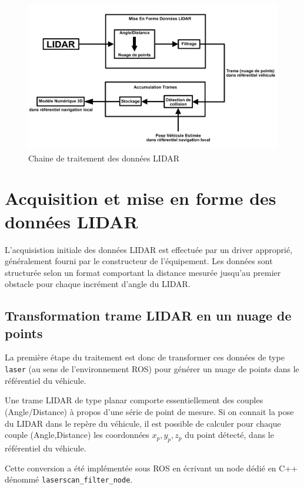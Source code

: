 \documentclass[12pt,a4paper]{report}
\begin{document}
\begin{figure}[h!]
	\centering
	\includegraphics[width=1\linewidth]{img/architraitlidar}
	\caption[architraitlidat]{Chaine de traitement des données LIDAR}
	\label{fig:architraitlidar}
\end{figure}

	\section{Acquisition et mise en forme des données LIDAR}
	L'acquisistion initiale des données LIDAR est effectuée par un driver approprié, généralement fourni par le constructeur de l'équipement. Les données sont structurée selon un format comportant la distance mesurée jusqu'au premier obstacle pour chaque incrément d'angle du LIDAR.

	
		\subsection{Transformation trame LIDAR en un nuage de points}
	
		\para La première étape du traitement est donc de transformer ces données de type \verb|laser| (au sens de l'environnement ROS) pour générer un nuage de points dans le référentiel du véhicule.
		
		\para Une trame LIDAR de type planar comporte essentiellement des couples (Angle/Distance) à propos d'une série de point de mesure. Si on connait la pose du LIDAR dans le repère du véhicule, il est possible de calculer pour chaque couple (Angle,Distance) les coordonnées $x_p,y_p,z_p$ du point détecté, dans le référentiel du véhicule.
		
		\para Cette conversion a été implémentée sous ROS en écrivant un node dédié en C++ dénommé \verb|laserscan_filter_node|. 
		
\end{document}
